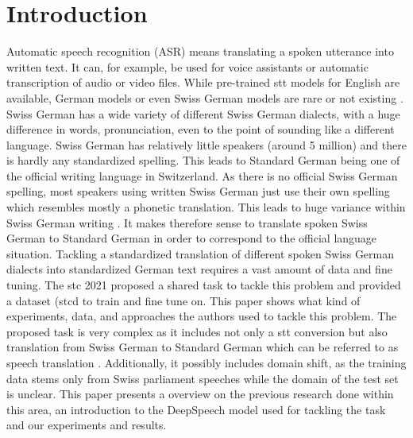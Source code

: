 \section{Introduction}
Automatic speech recognition (ASR) means translating a spoken utterance into written text. It can, for example, be used for voice assistants or automatic transcription of audio or video files. While pre-trained \gls{stt} models for English are available, German models or even Swiss German models are rare or not existing \cite{Agarwal2019GermanES}. Swiss German has a wide variety of different Swiss German dialects, with a huge difference in words, pronunciation, even to the point of sounding like a different language. Swiss German has relatively little speakers (around 5 million) and there is hardly any standardized spelling. This leads to Standard German being one of the official writing language in Switzerland. As there is no official Swiss German spelling, most speakers using written Swiss German just use their own spelling which resembles mostly a phonetic translation. This leads to huge variance within Swiss German writing \citep{pluss2020}. It makes therefore sense to translate spoken Swiss German to Standard German in order to correspond to the official language situation. Tackling a standardized translation of different spoken Swiss German dialects into standardized German text requires a vast amount of data and fine tuning. The \gls{stc} 2021 proposed a shared task to tackle this problem and provided a dataset
(\gls{stcd} to train and fine tune on. This paper shows what kind of experiments, data, and approaches the authors used to tackle this problem. The proposed task is very complex as it includes not only a \gls{stt} conversion but also translation from Swiss German to Standard German which can be referred to as speech translation \cite{pluss2020}. Additionally, it possibly includes domain shift, as the training data stems only from Swiss parliament speeches while the domain of the test set is unclear. 
This paper presents a overview on the previous research done within this area, an introduction to the DeepSpeech model used for tackling the task and our experiments and results.  
